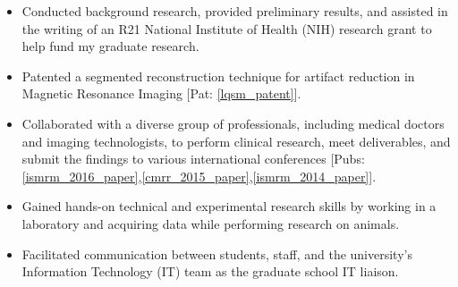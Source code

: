 \begin{minipage}{\textwidth}
	\begin{itemize}
	\item Conducted background research, provided preliminary results, and assisted in the writing of an R21 National Institute of Health (NIH) research grant to help fund my graduate research.
   	\item Patented a segmented reconstruction technique for artifact reduction in Magnetic Resonance Imaging [Pat: \ref{lqsm_patent}].
	\item Collaborated with a diverse group of professionals, including medical doctors and imaging technologists, to perform clinical research, meet deliverables, and submit the findings to various international conferences [Pubs: \ref{ismrm_2016_paper},\ref{cmrr_2015_paper},\ref{ismrm_2014_paper}].
	\item Gained hands-on technical and experimental research skills by working in a laboratory and acquiring data while performing research on animals.
	\item Facilitated communication between students, staff, and the university's Information Technology (IT) team as the graduate school IT liaison.

\end{itemize}
\end{minipage}
